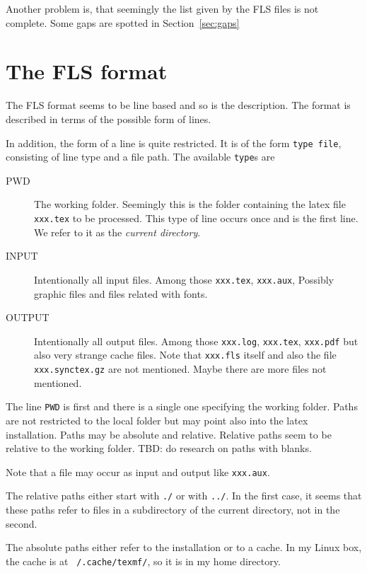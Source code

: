 \documentclass[a4paper, english]{article}%
\begin{document}
Another problem is, that seemingly the list given by the FLS files 
is not complete. 
Some gaps are spotted in Section~\ref{sec:gaps}


\section{The FLS format}\label{sec:format}

The FLS format seems to be line based and so is the description. 
The format is described in terms of the possible form of lines. 

In addition, the form of a line is quite restricted. 
It is of the form \texttt{type file}, consisting of line type and a file path. 
The available \texttt{type}s are 
%
\begin{description}
  \item[PWD] The working folder. 
  Seemingly this is the folder containing the latex file \texttt{xxx.tex} to be processed. 
  This type of line occurs once and is the first line. 
  We refer to it as the \emph{current directory}. 
  \item[INPUT] Intentionally all input files. Among those \texttt{xxx.tex}, \texttt{xxx.aux}, 
  Possibly graphic files and files related with fonts. 
  \item[OUTPUT] Intentionally all output files. 
  Among those \texttt{xxx.log}, \texttt{xxx.tex}, \texttt{xxx.pdf}
  but also very strange cache files. 
  Note that \texttt{xxx.fls} itself and also the file \texttt{xxx.synctex.gz} are not mentioned. 
  Maybe there are more files not mentioned. 
\end{description}

The line \texttt{PWD} is first and there is a single one specifying the working folder. 
Paths are not restricted to the local folder but may point also into the latex installation. 
Paths may be absolute and relative. 
Relative paths seem to be relative to the working folder. 
TBD\@: do research on paths with blanks. 

Note that a file may occur as input and output like \texttt{xxx.aux}. 

The relative paths either start with \texttt{./} or with \texttt{../}. 
In the first case, it seems that these paths refer to files in a subdirectory 
of the current directory, not in the second. 

The absolute paths either refer to the installation or to a cache. 
In my Linux box, the cache is at \texttt{~/.cache/texmf/}, so it is in my home directory. 
\end{document}
